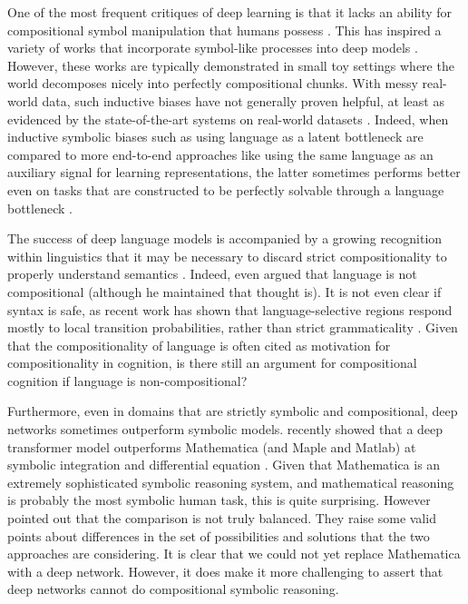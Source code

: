 One of the most frequent critiques of deep learning is that it lacks an ability for compositional symbol manipulation that humans possess \citep[e.g.][]{Lake2016,Lake2017,Marcus2018}. This has inspired a variety of works that incorporate symbol-like processes into deep models \citep[e.g.][]{Mao2019}. However, these works are typically demonstrated in small toy settings where the world decomposes nicely into perfectly compositional chunks. With messy real-world data, such inductive biases have not generally proven helpful, at least as evidenced by the state-of-the-art systems on real-world datasets \citep[e.g.][]{Radford2019}. Indeed, when inductive symbolic biases such as using language as a latent bottleneck are compared to more end-to-end approaches like using the same language as an auxiliary signal for learning representations, the latter sometimes performs better even on tasks that are constructed to be perfectly solvable through a language bottleneck \citep{Mu2019}. \par  
The success of deep language models is accompanied by a growing recognition within linguistics that it may be necessary to discard strict compositionality to properly understand semantics \citep{Goldberg2015,Potts2019}. Indeed, even \citet{Fodor2001} argued that language is not compositional (although he maintained that thought is). It is not even clear if syntax is safe, as recent work has shown that language-selective regions respond mostly to local transition probabilities, rather than strict grammaticality \citet{Mollica2020}. Given that the compositionality of language is often cited as motivation for compositionality in cognition, is there still an argument for compositional cognition if language is non-compositional? \par 
Furthermore, even in domains that are strictly symbolic and compositional, deep networks sometimes outperform symbolic models. \citet{Lample2019} recently showed that a deep transformer model outperforms Mathematica (and Maple and Matlab) at symbolic integration and differential equation \citep{Lample2019}. Given that Mathematica is an extremely sophisticated symbolic reasoning system, and mathematical reasoning is probably the most symbolic human task, this is quite surprising. However \citet{Davis2019} pointed out that the comparison is not truly balanced. They raise some valid points about differences in the set of possibilities and solutions that the two approaches are considering. It is clear that we could not yet replace Mathematica with a deep network. However, it does make it more challenging to assert that deep networks cannot do compositional symbolic reasoning. \par
